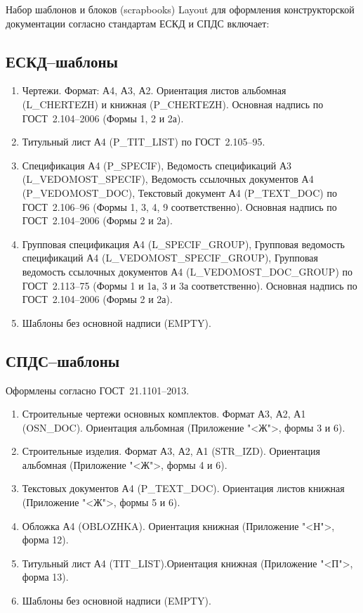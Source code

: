 \documentclass[14pt]{extreport}
\begin{document}
	Набор шаблонов и блоков (scrapbooks) Layout для оформления конструкторской документации согласно стандартам ЕСКД и СПДС включает:

	\subsection{ЕСКД--шаблоны}
	\begin{enumerate}
		\item Чертежи. Формат: А4, А3, А2. Ориентация листов альбомная (\textsf{L\_CHERTEZH}) и книжная (\textsf{P\_CHERTEZH}). Основная надпись по ГОСТ~2.104--2006 (Формы 1, 2 и 2а).
		\item Титульный лист А4 (\textsf{P\_TIT\_LIST}) по ГОСТ~2.105--95.
		\item Спецификация А4 (\textsf{P\_SPECIF}), Ведомость спецификаций А3 (\textsf{L\_VEDOMOST\_SPECIF}), Ведомость ссылочных документов А4 (\textsf{P\_VEDOMOST\_DOC}), Текстовый документ А4 (\textsf{P\_TEXT\_DOC}) по ГОСТ~2.106--96 (Формы 1, 3, 4, 9 соответственно). Основная надпись по ГОСТ~2.104--2006 (Формы 2 и 2а).
		\item Групповая спецификация А4 (\textsf{L\_SPECIF\_GROUP}), Групповая ведомость спецификаций А4  (\textsf{L\_VEDOMOST\_SPECIF\_GROUP}), Групповая ведомость ссылочных документов А4 (\textsf{L\_VEDOMOST\_DOC\_GROUP}) по ГОСТ~2.113--75 (Формы 1 и 1а, 3 и 3а соответственно).  Основная надпись по ГОСТ~2.104--2006 (Формы 2 и 2а).
		\item Шаблоны без основной надписи (\textsf{EMPTY}).
	\end{enumerate}
	\subsection{СПДС--шаблоны}

	Оформлены согласно ГОСТ~21.1101--2013.
	\begin{enumerate}
		\item Строительные чертежи основных комплектов. Формат А3, А2, А1 (\textsf{OSN\_DOC}). Ориентация альбомная (Приложение "<Ж">, формы 3 и 6).
		\item Строительные изделия. Формат А3, А2, А1 (\textsf{STR\_IZD}). Ориентация альбомная (Приложение "<Ж">, формы 4 и 6).
		\item Текстовых документов А4 (\textsf{P\_TEXT\_DOC}). Ориентация листов книжная (Приложение "<Ж">, формы 5 и 6).
		\item Обложка А4 (\textsf{OBLOZHKA}). Ориентация книжная (Приложение "<Н">, форма 12).
		\item Титульный лист А4 (\textsf{TIT\_LIST}).Ориентация книжная (Приложение "<П">, форма 13).
		\item Шаблоны без основной надписи (\textsf{EMPTY}).
	\end{enumerate}
\end{document}
